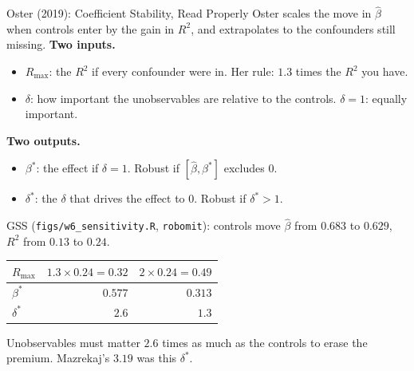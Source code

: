 \documentclass[aspectratio=169,11pt,xcolor=dvipsnames]{beamer}
\begin{document}
\begin{frame}{Oster (2019): Coefficient Stability, Read Properly}
\small
Oster scales the move in $\hat\beta$ when controls enter by the gain in
$R^2$, and extrapolates to the confounders still missing.
\textbf{Two inputs.}
\begin{itemize}\itemsep0pt
  \item $R_{\max}$: the $R^2$ if every confounder were in. Her rule:
        $1.3$ times the $R^2$ you have.
  \item $\delta$: how important the unobservables are relative to the
        controls. $\delta = 1$: equally important.
\end{itemize}
\textbf{Two outputs.}
\begin{itemize}\itemsep0pt
  \item $\beta^*$: the effect if $\delta = 1$. Robust if $[\hat\beta, \beta^*]$
        excludes $0$.
  \item $\delta^*$: the $\delta$ that drives the effect to $0$. Robust if
        $\delta^* > 1$.
\end{itemize}
GSS {\footnotesize(\texttt{figs/w6\_sensitivity.R}, \texttt{robomit})}:
controls move $\hat\beta$ from $0.683$ to $0.629$, $R^2$ from $0.13$ to $0.24$.
\vskip-4pt
\begin{center}\footnotesize
\renewcommand{\arraystretch}{1.0}
\begin{tabular}{lrr}
\toprule
$R_{\max}$ & $1.3 \times 0.24 = 0.32$ & $2 \times 0.24 = 0.49$ \\
\midrule
$\beta^*$ & $0.577$ & $0.313$ \\
$\delta^*$ & $2.6$ & $1.3$ \\
\bottomrule
\end{tabular}
\end{center}
\vskip-6pt
Unobservables must matter $2.6$ times as much as the controls to erase the
premium. Mazrekaj's $3.19$ was this $\delta^*$.
\end{frame}
\end{document}
